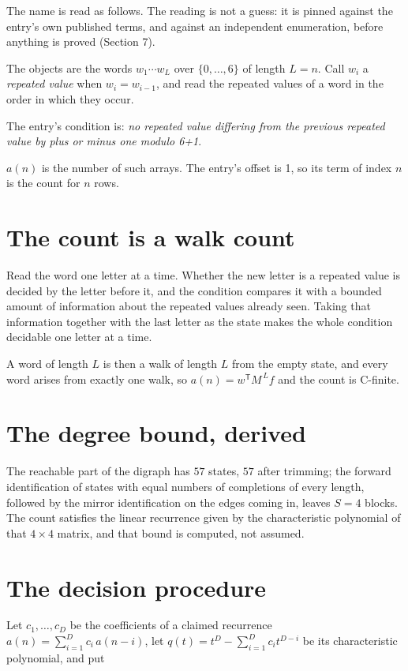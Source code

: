 \documentclass[11pt]{article}
\theoremstyle{definition}
\begin{document}
The name is read as follows. The reading is not a guess: it is pinned against the entry's own published terms, and against an independent enumeration, before anything is proved (Section 7).

The objects are the words $w_1\cdots w_L$ over $\{0,\dots,6\}$ of length $L = n$. Call $w_i$ a {\itshape repeated value} when $w_i = w_{i-1}$, and read the repeated values of a word in the order in which they occur.

The entry's condition is: {\itshape no repeated value differing from the previous repeated value by plus or minus one modulo 6+1}.

$a(n)$ is the number of such arrays. The entry's offset is 1, so its term of index $n$ is the count for $n$ rows.

\section{The count is a walk count}

Read the word one letter at a time. Whether the new letter is a repeated value is decided by the letter before it, and the condition compares it with a bounded amount of information about the repeated values already seen. Taking that information together with the last letter as the state makes the whole condition decidable one letter at a time.

A word of length $L$ is then a walk of length $L$ from the empty state, and every word arises from exactly one walk, so $a(n) = w^{\mathsf T}M^{\,L}f$ and the count is C-finite.

\section{The degree bound, derived}

The reachable part of the digraph has $57$ states, $57$ after trimming; the forward identification of states with equal numbers of completions of every length, followed by the mirror identification on the edges coming in, leaves $S = 4$ blocks. The count satisfies the linear recurrence given by the characteristic polynomial of that $4\times4$ matrix, and that bound is computed, not assumed.

\section{The decision procedure}

Let $c_1,\dots,c_D$ be the coefficients of a claimed recurrence $a(n) = \sum_{i=1}^{D} c_i\,a(n-i)$, let $q(t) = t^{D} - \sum_{i=1}^{D} c_i t^{D-i}$ be its characteristic polynomial, and put
\end{document}
